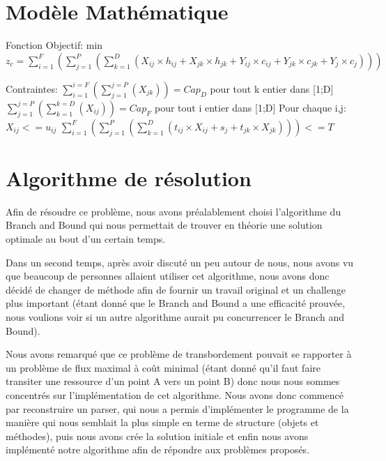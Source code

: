 \documentclass[a4paper,10pt]{article}
\begin{document}
\section{Modèle Mathématique}
\hspace{0.5cm}Fonction Objectif:\newline
min $z_{c} = \sum_{i=1}^{F} (\sum_{j=1}^{P} (\sum_{k=1}^{D} (X_{ij} \times h_{ij} + X_{jk} \times
h_{jk} + Y_{ij} \times c_{ij} + Y_{jk} \times c_{jk} + Y_{j} \times c_{j})))$

Contraintes:
\newline$ \sum_{i=1}^{i=F}(\sum_{j=1}^{j=P}(X_{jk})) = Cap_{D}$ pour tout k entier dans [1;D]
\newline$ \sum_{j=1}^{j=P}(\sum_{k=1}^{k=D}(X_{ij})) = Cap_{F}$ pour tout i entier dans [1;D]
\newline Pour chaque i,j: $X_{ij} <= u_{ij}$
\newline $ \sum_{i=1}^{F} (\sum_{j=1}^{P} (\sum_{k=1}^{D} (t_{ij} \times X_{ij} + s_{j} + t_{jk}
\times X_{jk}))) <= T$

\section{Algorithme de résolution}

\hspace{1cm}Afin de résoudre ce problème, nous avons préalablement choisi l'algorithme du Branch and Bound
qui nous permettait de trouver en théorie une solution optimale au bout d'un certain temps.\newline

\hspace{0.5cm}Dans un second temps, après avoir discuté un peu autour de nous, nous avons vu que beaucoup de 
personnes allaient utiliser cet algorithme, nous avons donc décidé de changer de méthode afin de 
fournir un travail original et un challenge plus important (étant donné que le Branch and Bound 
a une efficacité prouvée, nous voulions voir si un autre algorithme aurait pu concurrencer le 
Branch and Bound).\newline

\hspace{0.5cm}Nous avons remarqué que ce problème de transbordement pouvait se rapporter à un problème de flux
maximal à coût minimal (étant donné qu'il faut faire transiter une ressource d'un point A vers
un point B) donc nous nous sommes concentrés sur l'implémentation de cet algorithme. Nous avons
donc commencé par reconstruire un parser, qui nous a permis d'implémenter le programme de la manière
qui nous semblait la plus simple en terme de structure (objets et méthodes), puis nous avons crée
la solution initiale et enfin nous avons implémenté notre algorithme afin de répondre aux problèmes proposés.
\end{document}
